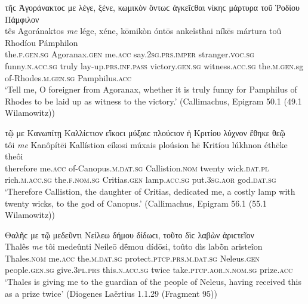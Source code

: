 \begin{exe}
\ex τῆϲ Ἀγοράνακτοϲ {με} λέγε, ξένε, κωμικὸν ὄντωϲ ἀγκεῖϲθαι νίκηϲ μάρτυρα τοῦ Ῥοδίου Πάμφιλον\\
\gll tês Agoránaktos \emph{me} lége, xéne, kōmikòn óntōs ankeîsthai níkēs mártura toû Rhodíou Pámphilon\\
the.\textsc{f.gen.sg} Agoranax.\textsc{gen} me.\textsc{acc} say.\textsc{2sg.prs.imper} stranger.\textsc{voc.sg} funny.\textsc{n.acc.sg} truly lay-up.\textsc{prs.inf.pass} victory.\textsc{gen.sg} witness.\textsc{acc.sg} the.\textsc{m.gen.}sg of-Rhodes.\textsc{m.gen.sg} Pamphilus.\textsc{acc}\\
\trans `Tell me, O foreigner from Agoranax, whether it is truly funny for Pamphilus of Rhodes to be laid up as witness to the victory.' (Callimachus, Epigram 50.1 (49.1 Wilamowitz))
\label{epi3}
\end{exe}

\begin{exe}
\ex τῷ {με} Κανωπίτῃ Καλλίϲτιον εἴκοϲι μύξαιϲ πλούϲιον ἡ Κριτίου λύχνον ἔθηκε θεῷ\\
\gll tôi \emph{me} Kanôpítēi Kallístion eíkosi múxais ploúsion hē Kritíou lúkhnon éthēke theôi\\
therefore me.\textsc{acc} of-Canopus.\textsc{m.dat.sg} Callistion.\textsc{nom} twenty wick.\textsc{dat.pl} rich.\textsc{m.acc.sg} the.\textsc{f.nom.sg} Critias.\textsc{gen} lamp.\textsc{acc.sg} put.\textsc{3sg.aor} god.\textsc{dat.sg}\\
\trans `Therefore Callistion, the daughter of Critias, dedicated me, a costly lamp with twenty wicks, to the god of Canopus.' (Callimachus, Epigram 56.1 (55.1 Wilamowitz))
\label{epi4}
\end{exe}

\begin{exe}
\ex Θαλῆϲ {με} τῷ μεδεῦντι Νείλεω δήμου δίδωϲι, τοῦτο δὶϲ λαβὼν ἀριϲτεῖον\\
\gll Thalês \emph{me} tôi medeûnti Neíleō dḗmou dídōsi, toûto dìs labṑn aristeîon\\
Thales.\textsc{nom} me.\textsc{acc} the.\textsc{m.dat.sg} protect.\textsc{ptcp.prs.m.dat.sg} Neleus.\textsc{gen} people.\textsc{gen.sg} give.\textsc{3pl.prs} this.\textsc{n.acc.sg} twice take.\textsc{ptcp.aor.n.nom.sg} prize.\textsc{acc}\\
\trans `Thales is giving me to the guardian of the people of Neleus, having received this as a prize twice' (Diogenes Laërtius 1.1.29 (Fragment 95))
\label{epi5}
\end{exe}

